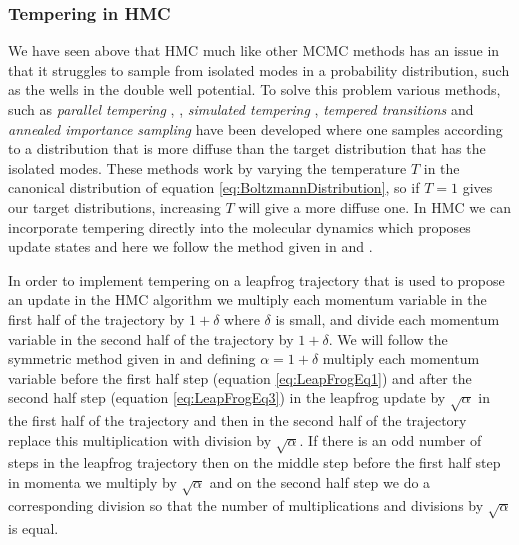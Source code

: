 \documentclass[12pt]{article}
\begin{document}
        \subsubsection{Tempering in HMC}
        We have seen above that HMC much like other MCMC methods \cite{neal_2011} has an issue in that it struggles to sample from isolated modes in a probability distribution, such as the wells in the double well potential. To solve this problem various methods, such as \textit{parallel tempering} \cite{geyer_1991}, \cite{earl_deem_2005}, \textit{simulated tempering} \cite{marinari_parisi_1992}, \textit{tempered transitions} \cite{neal_1996_b} and \textit{annealed importance sampling} \cite{neal_2001} have been developed where one samples according to a distribution that is more diffuse than the target distribution that has the isolated modes. These methods work by varying the temperature $T$ in the canonical distribution of equation \ref{eq:BoltzmannDistribution}, so if $T=1$ gives our target distributions, increasing $T$ will give a more diffuse one. In HMC we can incorporate tempering directly into the molecular dynamics which proposes update states and here we follow the method given in \cite{neal_2011} and \cite{neal_1996_b}.  

        In order to implement tempering on a leapfrog trajectory that is used to propose an update in the HMC algorithm we multiply each momentum variable in the first half of the trajectory by $1+\delta$ where $\delta$ is small, and divide each momentum variable in the second half of the trajectory by $1+\delta$. We will follow the symmetric method given in \cite{neal_2011} and defining $\alpha=1+\delta$ multiply each momentum variable before the first half step (equation \ref{eq:LeapFrogEq1}) and after the second half step (equation \ref{eq:LeapFrogEq3}) in the leapfrog update by $\sqrt{\alpha}$ in the first half of the trajectory and then in the second half of the trajectory replace this multiplication with division by $\sqrt{\alpha}$. If there is an odd number of steps in the leapfrog trajectory then on the middle step before the first half step in momenta we multiply by $\sqrt{\alpha}$  and on the second half step we do a corresponding division so that the number of multiplications and divisions by $\sqrt{\alpha}$ is equal.
\end{document}
